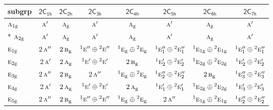 \documentclass[10pt,a4paper]{article}
\numberwithin{equation}{section}
\newcommand{\grp}[1]{\mathsf{#1}}
\newcommand{\irr}[1]{\text{\normalfont\scshape #1}}
\newcommand{\conjpair}[1]{{}^{#1}}
\newcommand{\ptag}[1]{\mathrm{#1}}
\begin{document}
{\small\begin{longtable}{@{}lccccccc@{}}\toprule
subgrp & \href{2C1h.pdf}{$\grp{2C_{1h}}$} & \href{2C2h.pdf}{$\grp{2C_{2h}}$} & \href{2C3h.pdf}{$\grp{2C_{3h}}$} & \href{2C4h.pdf}{$\grp{2C_{4h}}$} & \href{2C5h.pdf}{$\grp{2C_{5h}}$} & \href{2C6h.pdf}{$\grp{2C_{6h}}$} & \href{2C7h.pdf}{$\grp{2C_{7h}}$}\\\midrule\endhead
\bottomrule\endfoot\endlastfoot
$\irr{a}_{1\ptag{g}}$ & $\irr{a}'$ & $\irr{a}_{\ptag{g}}$ & $\irr{a}'$ & $\irr{a}_{\ptag{g}}$ & $\irr{a}'$ & $\irr{a}_{\ptag{g}}$ & $\irr{a}'$\\*
$\irr{a}_{2\ptag{g}}$ & $\irr{a}'$ & $\irr{a}_{\ptag{g}}$ & $\irr{a}'$ & $\irr{a}_{\ptag{g}}$ & $\irr{a}'$ & $\irr{a}_{\ptag{g}}$ & $\irr{a}'$\\
$\irr{e}_{1\ptag{g}}$ & $2\,\irr{a}''$ & $2\,\irr{b}_{\ptag{g}}$ & $\conjpair{1}\irr{e}''\oplus \conjpair{2}\irr{e}''$ & $\conjpair{1}\irr{e}_{\ptag{g}}\oplus \conjpair{2}\irr{e}_{\ptag{g}}$ & $\conjpair{1}\irr{e}_{1}''\oplus \conjpair{2}\irr{e}_{1}''$ & $\conjpair{1}\irr{e}_{1\ptag{g}}\oplus \conjpair{2}\irr{e}_{1\ptag{g}}$ & $\conjpair{1}\irr{e}_{1}''\oplus \conjpair{2}\irr{e}_{1}''$\\
$\irr{e}_{2\ptag{g}}$ & $2\,\irr{a}'$ & $2\,\irr{a}_{\ptag{g}}$ & $\conjpair{1}\irr{e}'\oplus \conjpair{2}\irr{e}'$ & $2\,\irr{b}_{\ptag{g}}$ & $\conjpair{1}\irr{e}_{2}'\oplus \conjpair{2}\irr{e}_{2}'$ & $\conjpair{1}\irr{e}_{2\ptag{g}}\oplus \conjpair{2}\irr{e}_{2\ptag{g}}$ & $\conjpair{1}\irr{e}_{2}'\oplus \conjpair{2}\irr{e}_{2}'$\\
$\irr{e}_{3\ptag{g}}$ & $2\,\irr{a}''$ & $2\,\irr{b}_{\ptag{g}}$ & $2\,\irr{a}''$ & $\conjpair{1}\irr{e}_{\ptag{g}}\oplus \conjpair{2}\irr{e}_{\ptag{g}}$ & $\conjpair{1}\irr{e}_{2}''\oplus \conjpair{2}\irr{e}_{2}''$ & $2\,\irr{b}_{\ptag{g}}$ & $\conjpair{1}\irr{e}_{3}''\oplus \conjpair{2}\irr{e}_{3}''$\\
$\irr{e}_{4\ptag{g}}$ & $2\,\irr{a}'$ & $2\,\irr{a}_{\ptag{g}}$ & $\conjpair{1}\irr{e}'\oplus \conjpair{2}\irr{e}'$ & $2\,\irr{a}_{\ptag{g}}$ & $\conjpair{1}\irr{e}_{1}'\oplus \conjpair{2}\irr{e}_{1}'$ & $\conjpair{1}\irr{e}_{2\ptag{g}}\oplus \conjpair{2}\irr{e}_{2\ptag{g}}$ & $\conjpair{1}\irr{e}_{3}'\oplus \conjpair{2}\irr{e}_{3}'$\\
$\irr{e}_{5\ptag{g}}$ & $2\,\irr{a}''$ & $2\,\irr{b}_{\ptag{g}}$ & $\conjpair{1}\irr{e}''\oplus \conjpair{2}\irr{e}''$ & $\conjpair{1}\irr{e}_{\ptag{g}}\oplus \conjpair{2}\irr{e}_{\ptag{g}}$ & $2\,\irr{a}''$ & $\conjpair{1}\irr{e}_{1\ptag{g}}\oplus \conjpair{2}\irr{e}_{1\ptag{g}}$ & $\conjpair{1}\irr{e}_{2}''\oplus \conjpair{2}\irr{e}_{2}''$\\

\end{longtable}}
\end{document}
